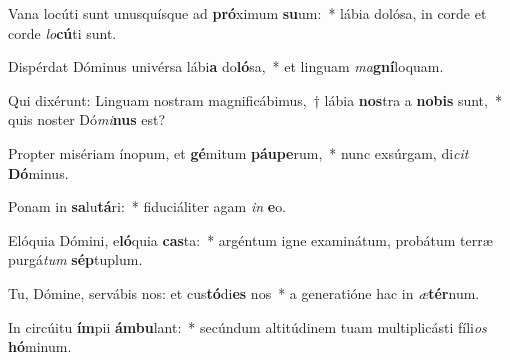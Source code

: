 \item Vana locúti sunt unusquísque ad \textbf{pró}ximum \textbf{su}um:~* lábia dolósa, in corde et corde \textit{lo}\textbf{cú}ti sunt.
\item Dispérdat Dóminus univérsa lábi\textbf{a} do\textbf{ló}sa,~* et linguam \textit{ma}\textbf{gní}loquam.
\item Qui dixérunt: Linguam nostram magnificábimus,~† lábia \textbf{nos}tra a \textbf{no}\textbf{bis} sunt,~* quis noster Dó\textit{mi}\textbf{nus} est?
\item Propter misériam ínopum, et \textbf{gé}mitum \textbf{páu}\textbf{pe}rum,~* nunc exsúrgam, di\textit{cit} \textbf{Dó}minus.
\item Ponam in \textbf{sa}lu\textbf{tá}ri:~* fiduciáliter agam \textit{in} \textbf{e}o.
\item Elóquia Dómini, e\textbf{ló}quia \textbf{cas}ta:~* argéntum igne examinátum, probátum terræ purgá\textit{tum} \textbf{sép}tuplum.
\item Tu, Dómine, servábis nos: et cus\textbf{tó}di\textbf{es} nos~* a generatióne hac in \textit{æ}\textbf{tér}num.
\item In circúitu \textbf{ím}pii \textbf{ám}\textbf{bu}lant:~* secúndum altitúdinem tuam multiplicásti fíli\textit{os} \textbf{hó}minum.
